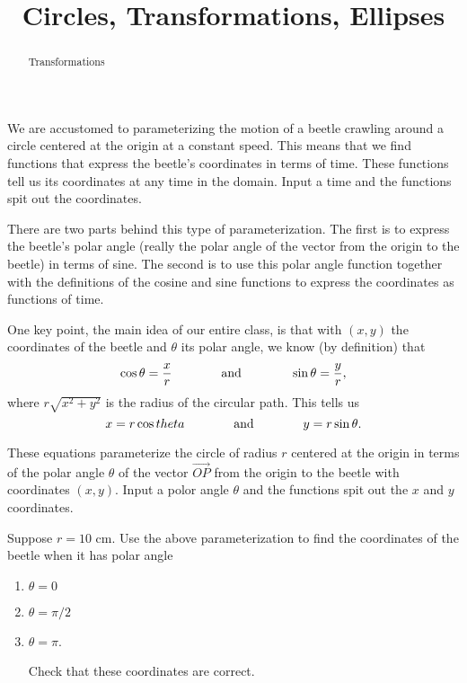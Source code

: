 \documentclass{ximera}
\title{Circles, Transformations, Ellipses}
\begin{document}
\begin{abstract}
Transformations
\end{abstract}
\maketitle



We are accustomed to parameterizing the motion of a beetle crawling around a circle centered at the origin at a constant speed. This means that we find functions that express the beetle's coordinates in terms of time. These functions tell us its coordinates at any time in the domain. Input a time and the functions spit out the coordinates.

There are two parts behind this type of parameterization. The first is to express the beetle's polar angle (really the polar angle of the vector from the origin to the beetle) in terms of sine. The second is to use this polar angle function together with the definitions of the cosine and sine functions to express the coordinates as functions of time.

One key point, the main idea of our entire class, is that with $(x,y)$ the coordinates of the beetle and $\theta$ its polar angle, we know (by definition) that
\[
   \cos\theta = \frac{x}{r} \hskip 0.5 in \text{ and } \hskip 0.5 in \sin\theta = \frac{y}{r},
\] 
where $r\sqrt{x^2+y^2}$ is the radius of the circular path. This tells us
\[
   x = r \cos theta \hskip 0.5 in \text{ and } \hskip 0.5 in  y = r\sin \theta.
\]

These equations parameterize the circle of radius $r$ centered at the origin in terms of the polar angle $\theta$ of the vector $\overrightarrow{OP}$ from the origin to the beetle with coordinates $(x,y)$. Input a polor angle $\theta$ and the functions spit out the $x$ and $y$ coordinates.

\begin{question} \label{Q9edDEFRLERr3}
Suppose $r=10$ cm. Use the above parameterization to find the coordinates of the beetle when it has polar angle
\begin{enumerate}
\item $\theta = 0$

\item $\theta = \pi/2$

\item $\theta = \pi$.

Check that these coordinates are correct.
\end{enumerate}
\end{question}
\end{document}
